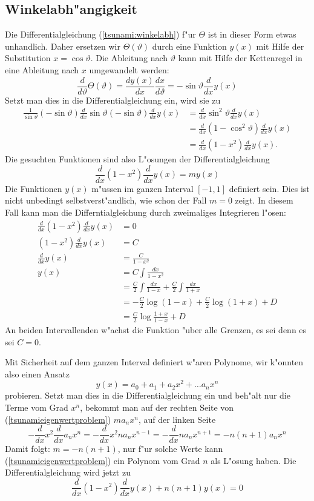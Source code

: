 \subsection{Winkelabh"angigkeit}
Die Differentialgleichung (\ref{tsunami:winkelabh}) f"ur $\Theta$
ist in dieser Form etwas unhandlich.
Daher ersetzen wir $\Theta(\vartheta)$ durch eine
Funktion $y(x)$ mit Hilfe der Substitution $x=\cos\vartheta$.
Die Ableitung nach $\vartheta$ kann mit Hilfe der Kettenregel
in eine Ableitung nach $x$ umgewandelt werden:
\[
\frac{d}{d\vartheta}\Theta(\vartheta)
=\frac{dy(x)}{dx}\frac{dx}{d\vartheta}
=-\sin\vartheta \frac{d}{dx} y(x)
\]
Setzt man dies in die Differentialgleichung ein, wird sie zu
\begin{align*}
\frac1{\sin\vartheta}
(-\sin{\vartheta})\frac{d}{dx}\sin\vartheta (-\sin\vartheta)
\frac{d}{dx}y(x)
&=
\frac{d}{dx}\sin^2\vartheta\frac{d}{dx}y(x)\\
&=
\frac{d}{dx}(1-\cos^2\vartheta)\frac{d}{dx}y(x)\\
&=
\frac{d}{dx}(1-x^2)\frac{d}{dx}y(x).
\end{align*}
Die gesuchten Funktionen sind also L"osungen der Differentialgleichung
\begin{equation}
\frac{d}{dx}(1-x^2)\frac{d}{dx}y(x)
=
my(x)
\label{tsunamieigenwertproblem}
\end{equation}
Die Funktionen $y(x)$ m"ussen im ganzen Interval $[-1,1]$ definiert
sein. Dies ist nicht unbedingt selbstverst"andlich, wie schon der Fall
$m=0$ zeigt. In diesem Fall kann man die Differntialgleichung
durch zweimaliges Integrieren l"osen:
\begin{align*}
\frac{d}{dx}(1-x^2)\frac{d}{dx}y(x)&=0\\
(1-x^2)\frac{d}{dx}y(x)&=C\\
\frac{d}{dx}y(x)&=\frac{C}{1-x^2}\\
y(x)&=C\int\frac{dx}{1-x^2}\\
&=\frac{C}2\int\frac{dx}{1-x}+\frac{C}2\int\frac{dx}{1+x}\\
&=-\frac{C}2\log(1-x)+\frac{C}2\log(1+x) +D\\
&=\frac{C}2\log\frac{1+x}{1-x} + D
\end{align*}
An beiden Intervallenden w"achst die Funktion "uber alle Grenzen,
es sei denn es sei $C=0$.

Mit Sicherheit auf dem ganzen Interval definiert w"aren Polynome,
wir k"onnten also einen Ansatz
\[
y(x)=a_0+a_1+a_2x^2+\dots a_nx^n
\]
probieren. Setzt man dies in die Differentialgleichung ein und
beh"alt nur die Terme vom Grad $x^n$, bekommt man auf der rechten
Seite von (\ref{tsunamieigenwertproblem}) $ma_nx^n$, auf
der linken Seite
\[
-\frac{d}{dx}x^2\frac{d}{dx}a_nx^n
=
-\frac{d}{dx}x^2na_nx^{n-1}
=
-\frac{d}{dx}na_nx^{n+1}
=
-n(n+1)a_nx^n
\]
Damit folgt: $m=-n(n+1)$, nur f"ur solche Werte kann
(\ref{tsunamieigenwertproblem}) ein Polynom vom Grad $n$ als L"osung
haben. Die Differentialgleichung wird jetzt zu
\begin{equation}
\frac{d}{dx}(1-x^2)\frac{d}{dx}y(x)+n(n+1)y(x)=0
\label{legendredgl}
\end{equation}

